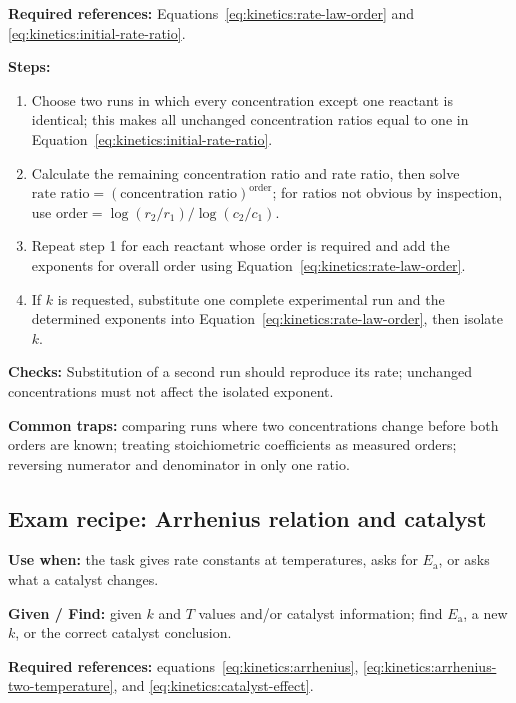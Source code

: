 \textbf{Required references:} Equations~\eqref{eq:kinetics:rate-law-order} and \eqref{eq:kinetics:initial-rate-ratio}.

\textbf{Steps:}
\begin{enumerate}
    \item Choose two runs in which every concentration except one reactant is identical; this makes all unchanged concentration ratios equal to one in Equation~\eqref{eq:kinetics:initial-rate-ratio}.
    \item Calculate the remaining concentration ratio and rate ratio, then solve \(\text{rate ratio}=(\text{concentration ratio})^{\text{order}}\); for ratios not obvious by inspection, use \(\text{order}=\log(r_2/r_1)/\log(c_2/c_1)\).
    \item Repeat step 1 for each reactant whose order is required and add the exponents for overall order using Equation~\eqref{eq:kinetics:rate-law-order}.
    \item If \(k\) is requested, substitute one complete experimental run and the determined exponents into Equation~\eqref{eq:kinetics:rate-law-order}, then isolate \(k\).
\end{enumerate}

\textbf{Checks:} Substitution of a second run should reproduce its rate; unchanged concentrations must not affect the isolated exponent.

\textbf{Common traps:} comparing runs where two concentrations change before both orders are known; treating stoichiometric coefficients as measured orders; reversing numerator and denominator in only one ratio.

\subsection{Exam recipe: Arrhenius relation and catalyst}
\textbf{Use when:} the task gives rate constants at temperatures, asks for \(E_{\mathrm a}\), or asks what a catalyst changes.

\textbf{Given / Find:} given \(k\) and \(T\) values and/or catalyst information; find \(E_{\mathrm a}\), a new \(k\), or the correct catalyst conclusion.

\textbf{Required references:} equations~\eqref{eq:kinetics:arrhenius}, \eqref{eq:kinetics:arrhenius-two-temperature}, and \eqref{eq:kinetics:catalyst-effect}.


